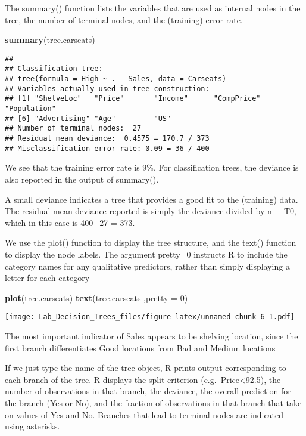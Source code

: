 \documentclass[]{article}
\newenvironment{Shaded}{\begin{snugshade}}{\end{snugshade}}
\newcommand{\KeywordTok}[1]{\textcolor[rgb]{0.13,0.29,0.53}{\textbf{#1}}}
\newcommand{\DataTypeTok}[1]{\textcolor[rgb]{0.13,0.29,0.53}{#1}}
\newcommand{\DecValTok}[1]{\textcolor[rgb]{0.00,0.00,0.81}{#1}}
\newcommand{\NormalTok}[1]{#1}
\begin{document}
The summary() function lists the variables that are used as internal
nodes in the tree, the number of terminal nodes, and the (training)
error rate.

\begin{Shaded}
\begin{Highlighting}[]
\KeywordTok{summary}\NormalTok{(tree.carseats)}
\end{Highlighting}
\end{Shaded}

\begin{verbatim}
## 
## Classification tree:
## tree(formula = High ~ . - Sales, data = Carseats)
## Variables actually used in tree construction:
## [1] "ShelveLoc"   "Price"       "Income"      "CompPrice"   "Population" 
## [6] "Advertising" "Age"         "US"         
## Number of terminal nodes:  27 
## Residual mean deviance:  0.4575 = 170.7 / 373 
## Misclassification error rate: 0.09 = 36 / 400
\end{verbatim}

We see that the training error rate is 9\%. For classification trees,
the deviance is also reported in the output of summary().

A small deviance indicates a tree that provides a good fit to the
(training) data. The residual mean deviance reported is simply the
deviance divided by n − \textbar{}T0\textbar{}, which in this case is
400−27 = 373.

We use the plot() function to display the tree structure, and the text()
function to display the node labels. The argument pretty=0 instructs R
to include the category names for any qualitative predictors, rather
than simply displaying a letter for each category

\begin{Shaded}
\begin{Highlighting}[]
\KeywordTok{plot}\NormalTok{(tree.carseats)}
\KeywordTok{text}\NormalTok{(tree.carseats ,}\DataTypeTok{pretty =} \DecValTok{0}\NormalTok{)}
\end{Highlighting}
\end{Shaded}

\texttt{[image: Lab\_Decision\_Trees\_files/figure-latex/unnamed-chunk-6-1.pdf]}

The most important indicator of Sales appears to be shelving location,
since the first branch differentiates Good locations from Bad and Medium
locations

If we just type the name of the tree object, R prints output
corresponding to each branch of the tree. R displays the split criterion
(e.g.~Price\textless{}92.5), the number of observations in that branch,
the deviance, the overall prediction for the branch (Yes or No), and the
fraction of observations in that branch that take on values of Yes and
No. Branches that lead to terminal nodes are indicated using asterisks.
\end{document}
